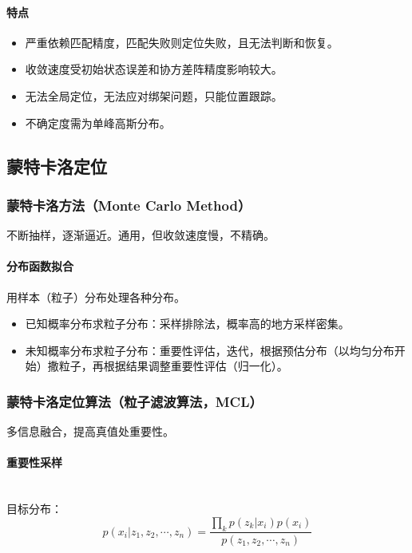 \documentclass[
12pt, %
a4paper, 
oneside, %
headinclude,footinclude, %
]{scrartcl}
\begin{document}
\paragraph{特点}
\begin{itemize}
\item 严重依赖匹配精度，匹配失败则定位失败，且无法判断和恢复。
\item 收敛速度受初始状态误差和协方差阵精度影响较大。
\item 无法全局定位，无法应对绑架问题，只能位置跟踪。
\item 不确定度需为单峰高斯分布。
\end{itemize}
\subsection[蒙特卡洛定位]{蒙特卡洛定位}
\subsubsection[蒙特卡洛方法]{蒙特卡洛方法（Monte Carlo Method）}
不断抽样，逐渐逼近。通用，但收敛速度慢，不精确。
\paragraph{分布函数拟合}
用样本（粒子）分布处理各种分布。
\begin{itemize}
\item 已知概率分布求粒子分布：采样排除法，概率高的地方采样密集。
\item 未知概率分布求粒子分布：重要性评估，迭代，根据预估分布（以均匀分布开始）撒粒子，再根据结果调整重要性评估（归一化）。
\end{itemize}
\subsubsection[蒙特卡洛定位算法（粒子滤波算法）]{蒙特卡洛定位算法（粒子滤波算法，MCL）}
多信息融合，提高真值处重要性。
\paragraph{重要性采样}~\\

目标分布：
$$ p(x_i|z_1, z_2, \cdots, z_n) = \frac{\prod_k p(z_k|x_i)p(x_i)}{p(z_1, z_2, \cdots, z_n)} $$
\end{document}
